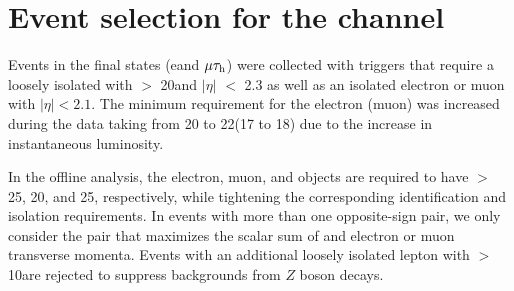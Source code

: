 \section{\texorpdfstring{Event selection for the \leptonTau channel}{Event selection for the lepton-tau channel}}
\label{sect:eleTauCuts}
Events in the \leptonTau final states (e\Tau and $\mu\tau_{\rm h}$)
were collected with triggers that require 
a loosely isolated \Tau with \PT $>$ 20\GeV and $|\eta|$ $<$ 2.3 as well as
an isolated electron or muon with $|\eta| < 2.1$.  The minimum
\PT requirement for the electron (muon) was increased during the data taking from 20 to 22\GeV (17 to 18\GeV)
due to the increase in instantaneous luminosity.

In the offline analysis, the electron, muon, and \Tau objects are required to have \PT $>$ 25, 20, and 25\GeV, respectively, 
while tightening the corresponding identification and isolation requirements.
In events with more than one opposite-sign \leptonTau pair, we only consider
 the pair that maximizes the scalar sum of \Tau and electron or muon 
transverse momenta.  Events with an additional loosely isolated lepton
with \PT $>$ 10\GeV are rejected to suppress backgrounds from $Z$ boson
decays.  

